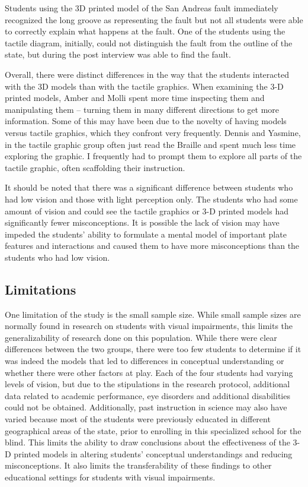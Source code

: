 \documentclass[11.5pt]{sig-alternate} %
\begin{document}
\begin{large}
Students using the 3D printed model of the San Andreas fault immediately recognized the long groove as representing the fault but not all students were able to correctly explain what happens at the fault.  One of the students using the tactile diagram, initially, could not distinguish the fault from the outline of the state, but during the post interview was able to find the fault.  

Overall, there were distinct differences in the way that the students interacted with the 3D models than with the tactile graphics.  When examining the 3-D printed models, Amber and Molli spent more time inspecting them and manipulating them – turning them in many different directions to get more information.  Some of this may have been due to the novelty of having models versus tactile graphics, which they confront very frequently.  Dennis and Yasmine, in the tactile graphic group often just read the Braille and spent much less time exploring the graphic.  I frequently had to prompt them to explore all parts of the tactile graphic, often scaffolding their instruction.  

It should be noted that there was a significant difference between students who had low vision and those with light perception only.  The students who had some amount of vision and could see the tactile graphics or 3-D printed models had significantly fewer misconceptions.  It is possible the lack of vision may have impeded the students’ ability to formulate a mental model of important plate features and interactions and caused them to have more misconceptions than the students who had low vision. 

\subsection*{Limitations}

One limitation of the study is the small sample size.  While small sample sizes are normally found in research on students with visual impairments, this limits the generalizability of research done on this population.  While there were clear differences between the two groups, there were too few students to determine if it was indeed the models that led to differences in conceptual understanding or whether there were other factors at play.  Each of the four students had varying levels of vision, but due to the stipulations in the research protocol, additional data related to academic performance, eye disorders and additional disabilities could not be obtained.  Additionally, past instruction in science may also have varied because most of the students were previously educated in different geographical areas of the state, prior to enrolling in this specialized school for the blind.  This limits the ability to draw conclusions about the effectiveness of the 3-D printed models in altering students’ conceptual understandings and reducing misconceptions.  It also limits the transferability of these findings to other educational settings for students with visual impairments.  


\end{large}
\end{document}
